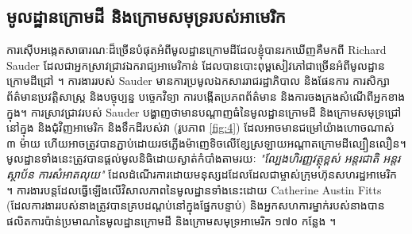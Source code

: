 \documentclass[10pt,twocolumn,letterpaper]{article}
\begin{document}
\subsection{មូលដ្ឋានក្រោមដី និងក្រោមសមុទ្ររបស់អាមេរិក}

ការស៊ើបអង្កេតសាធារណៈដ៏ច្រើនបំផុតអំពីមូលដ្ឋានក្រោមដីដែលខ្ញុំបានរកឃើញគឺមកពី Richard Sauder ដែលជាអ្នកស្រាវជ្រាវឯករាជ្យអាមេរិកាន់ ដែលបានបោះពុម្ពសៀវភៅជាច្រើនអំពីមូលដ្ឋានក្រោមដីជ្រៅ \cite{22}។ ការងាររបស់ Sauder មានការប្រមូលឯកសាររាជរដ្ឋាភិបាល និងផែនការ ការសិក្សាព័ត៌មានប្រវត្តិសាស្ត្រ និងបច្ចុប្បន្ន បច្ចេកវិទ្យា ការបង្កើតប្រភពព័ត៌មាន និងការចងក្រងសំណើពីអ្នកខាងក្នុង។ ការស្រាវជ្រាវរបស់ Sauder បង្ហាញថាមានបណ្តាញធំនៃមូលដ្ឋានក្រោមដី និងក្រោមសមុទ្រជ្រៅនៅក្នុង និងជុំវិញអាមេរិក និងទឹកដីរបស់វា (រូបភាព \ref{fig:4}) ដែលអាចមានជម្រៅយ៉ាងហោចណាស់ ៣ ម៉ាយ ហើយអាចត្រូវបានភ្ជាប់ដោយរថភ្លើងម៉ាញេទិចលើខ្សែស្រឡាយអណ្តាតក្រោមដីល្បឿនលឿន។ មូលដ្ឋានទាំងនេះត្រូវបានផ្តល់មូលនិធិដោយស្ងាត់កំបាំងតាមរយៈ \textit{"ល្បែងហិរញ្ញវត្ថុខ្ពស់ អន្តរជាតិ អន្តរស្ថាប័ន ការសំអាតលុយ"} ដែលដំណើរការដោយមនុស្សដដែលដែលជាម្ចាស់ក្រុមហ៊ុនសហរដ្ឋអាមេរិក \cite{22}។ ការងារបន្តដែលធ្វើឡើងលើវិសាលភាពនៃមូលដ្ឋានទាំងនេះដោយ Catherine Austin Fitts (ដែលការងាររបស់នាងត្រូវបានគ្របដណ្តប់នៅក្នុងផ្នែកបន្ទាប់) និងអ្នកសហការម្នាក់របស់នាងបានផលិតការប៉ាន់ប្រមាណនៃមូលដ្ឋានក្រោមដី និងក្រោមសមុទ្រអាមេរិក ១៧០ កន្លែង \cite{16,20}។
\end{document}
